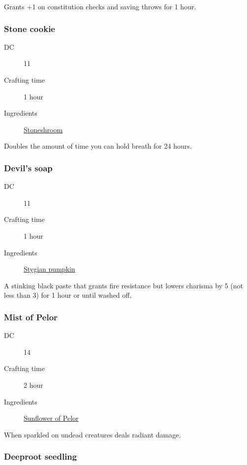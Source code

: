 Grants +1 on constitution checks and saving throws for 1 hour.

\subsubsection{Stone cookie}
\label{Stone cookie}

\begin{description}
\item [DC] 11
\item [Crafting time] 1 hour
\item [Ingredients] \hyperref[Stoneshroom]{Stoneshroom}
\end{description}

Doubles the amount of time you can hold breath for 24 hours.

\subsubsection{Devil's soap}
\label{Devil's soap}

\begin{description}
\item [DC] 11
\item [Crafting time] 1 hour
\item [Ingredients] \hyperref[Stygian Pumpkin]{Stygian pumpkin}
\end{description}

A stinking black paste that grants fire resistance but lowers charisma by 5 (not less than 3)
for 1 hour or until washed off.

\subsubsection{Mist of Pelor}
\label{Mist of Pelor}

\begin{description}
\item [DC] 14
\item [Crafting time] 2 hour
\item [Ingredients] \hyperref[Sunflower of Pelor]{Sunflower of Pelor}
\end{description}

When sparkled on undead creatures deals  radiant damage.

\subsubsection{Deeproot seedling}
\label{Deeproot seedling}

